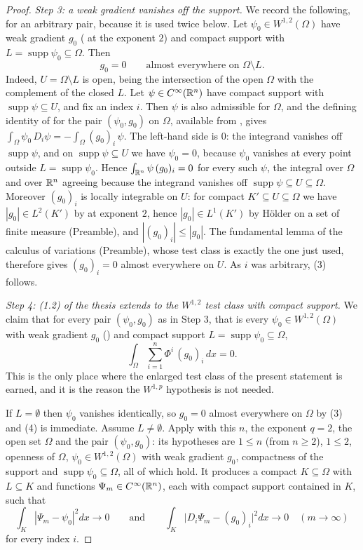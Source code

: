 \begin{proof}
\emph{Step 3: a weak gradient vanishes off the support.}  We record the
following, for an arbitrary pair, because it is used twice below.  Let
$\psi_0\in W^{1,2}(\Omega)$ have weak gradient $g_0$ ( at the
exponent $2$) and compact support with
$L=\operatorname{supp}\psi_0\subseteq\Omega$.  Then
\[
g_0=0\qquad\text{almost everywhere on }\Omega\setminus L .
\tag{3}
\]
Indeed, $U=\Omega\setminus L$ is open, being the intersection of the open
$\Omega$ with the complement of the closed $L$.  Let $\psi\in C^\infty(\mathbb{R}^n)$
have compact support with $\operatorname{supp}\psi\subseteq U$, and fix an index
$i$.  Then $\psi$ is also admissible for $\Omega$, and the defining identity of
 for the pair $(\psi_0,g_0)$ on $\Omega$, available
from , gives
$\int_\Omega\psi_0\,D_i\psi=-\int_\Omega(g_0)_i\,\psi$.  The left-hand side is
$0$: the integrand vanishes off $\operatorname{supp}\psi$, and on
$\operatorname{supp}\psi\subseteq U$ we have $\psi_0=0$, because $\psi_0$
vanishes at every point outside $L=\operatorname{supp}\psi_0$.  Hence
$\int_{\mathbb{R}^n}\psi\,(g_0)_i=0$ for every such $\psi$, the integral over $\Omega$
and over $\mathbb{R}^n$ agreeing because the integrand vanishes off
$\operatorname{supp}\psi\subseteq U\subseteq\Omega$.  Moreover $(g_0)_i$ is
locally integrable on $U$: for compact $K'\subseteq U\subseteq\Omega$ we have
$|g_0|\in L^2(K')$ by  at exponent $2$, hence
$|g_0|\in L^1(K')$ by H\"older on a set of finite measure (Preamble), and
$|(g_0)_i|\le|g_0|$.  The fundamental lemma of the calculus of variations
(Preamble), whose test class is exactly the one just used, therefore gives
$(g_0)_i=0$ almost everywhere on $U$.  As $i$ was arbitrary, (3) follows.

\emph{Step 4: (1.2) of the thesis extends to the $W^{1,2}$ test class with compact
support.}  We claim that for every pair $(\psi_0,g_0)$ as in Step 3, that is
every $\psi_0\in W^{1,2}(\Omega)$ with weak gradient $g_0$
() and compact support
$L=\operatorname{supp}\psi_0\subseteq\Omega$,
\[
\int_\Omega\sum_{i=1}^n\Phi^i\,(g_0)_i\,dx=0 .
\tag{4}
\]
This is the only place where the enlarged test class of the present statement is
earned, and it is the reason the $W^{1,p}$ hypothesis is not needed.

If $L=\emptyset$ then $\psi_0$ vanishes identically, so $g_0=0$ almost
everywhere on $\Omega$ by (3) and (4) is immediate.  Assume $L\ne\emptyset$.
Apply  with this $n$, the exponent $q=2$, the
open set $\Omega$ and the pair $(\psi_0,g_0)$: its hypotheses are $1\le n$
(from $n\ge2$), $1\le2$, openness of $\Omega$, $\psi_0\in W^{1,2}(\Omega)$ with
weak gradient $g_0$, compactness of the support and
$\operatorname{supp}\psi_0\subseteq\Omega$, all of which hold.  It produces a
compact $K\subseteq\Omega$ with $L\subseteq K$ and functions
$\Psi_m\in C^\infty(\mathbb{R}^n)$, each with compact support contained in $K$, such
that
\[
\int_K|\Psi_m-\psi_0|^2dx\longrightarrow0
\qquad\text{and}\qquad
\int_K\bigl|D_i\Psi_m-(g_0)_i\bigr|^2dx\longrightarrow0
\quad(m\to\infty)
\tag{5}
\]
for every index $i$.


\end{proof}
